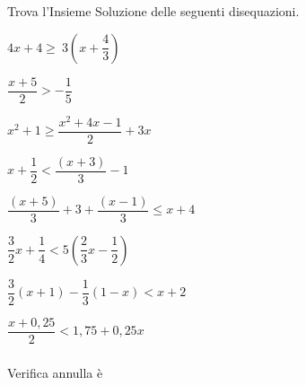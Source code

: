 \begin{esercizio}[*]
 \label{ese:dis_14}
Trova l'Insieme Soluzione delle seguenti disequazioni.
 \begin{htmulticols}{2}
 \begin{enumeratea}
\item \(4x+4\ge~3\left(x+\dfrac{4}{3}\right)\)
\item \(\dfrac{x+5}{2}>-{\dfrac{1}{5}}\)
\item \(x^2+1\ge\dfrac{x^2+4x-1}{2}+3x\)
\item \(x+\dfrac{1}{2}<\dfrac{(x+3)}{3}-1\)
\item \(\dfrac{(x+5)}{3}+3+\dfrac{(x-1)}{3}\le x+4\)
\item \(\dfrac{3}{2}x+\dfrac{1}{4}<5\left(\dfrac{2}{3}x-\dfrac{1}{2}\right)\)
\item \(\dfrac{3}{2}(x+1)-\dfrac{1}{3}(1-x)<x+2\)
\item \(\dfrac{x+0,25}{2}<1,75+0,25x\)
\end{enumeratea}
\end{htmulticols}
\end{esercizio}

\newpage   %

\subsubsection*{}

Verifica 
annulla 
è 

